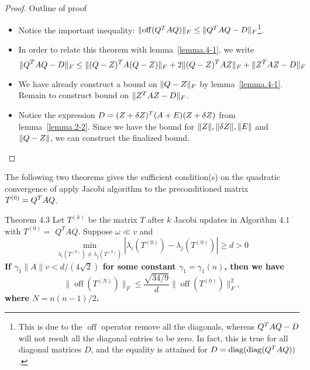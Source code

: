 \documentclass{article}
\DeclareMathOperator{\off}{off}
\begin{document}
\begin{proof}
    {Outline of proof}
    \ 

    \begin{itemize}
        \item Notice the important inequality: $\fnorm{\off(Q\tp AQ)}
        \leq \fnorm{Q\tp A Q - D}$\footnote{This is due to the $\off$
        operator remove all the diagonals, whereas $Q^{T} A Q - D$ will
        not result all the diagonal entries to be zero. In fact, this is
        true for all diagonal matrices $D$, and the equality is attained
        for $D = \operatorname{diag}(\operatorname{diag}(Q^{T} AQ))$.}.
        \item In order to relate this theorem with
        lemma~\ref{lemma.4-1}, we write 
        \begin{equation}\notag
            \|{Q^{T} A Q - D}\|_F \leq \|{(Q-Z)^{T} A (Q-Z)}\|_F 
            + 2\|{(Q-Z)^{T} AZ}\|_F + \|{Z^{T} A Z - D}\|_F
        \end{equation}
        \item We have already construct a bound on $\|{Q-Z}\|_F$ by
        lemma~\ref{lemma.4-1}. Remain to construct bound on $\|{Z^{T}
        A Z - D}\|_F$.
        \item Notice the expression $D=(Z+\delta Z)^{T} (A + E)(Z +
        \delta Z)$ from lemma~\ref{lemma.2-2}. Since we have the bound
        for $\|{Z}\|, \|{\delta Z}\|, \|{E}\|$ and $\|{Q-Z}\|$, we
        can construct the finalized bound.
    \end{itemize}
\end{proof}

The following two theorems gives the sufficient condition(s) on the
quadratic convergence of apply Jacobi algorithm to the preconditioned
matrix $T^{(0)} = Q^{T} A Q$.

\begin{theorem}\label{thm.4-3}
    Theorem 4.3 Let $T^{(k)}$ be the matrix $T$ after $k$ Jacobi updates
    in Algorithm $4.1$ with $T^{(0)}=$ $Q^T A Q$. Suppose $\omega \ll v$
    and 
    $$
        \min_{\lambda_i\left(T^{(0)}\right) 
        \neq \lambda_j\left(T^{(0)}\right)}
        \left|\lambda_i\left(T^{(0)}\right)
        -\lambda_j\left(T^{(0)}\right)\right| \geq d>0 
    $$
    \bf{If $\gamma_1\|A\| v<d /(4 \sqrt{2})$} for some constant
    $\gamma_1=\gamma_1(n)$, then we have 
    $$
        \|\operatorname{off}\left(T^{(N)}\right)
        \|_F \leq \frac{\sqrt{34 / 9}}{d}
        \|\operatorname{off}\left(T^{(0)}\right)\|_F^2,
    $$
    where $N=n(n-1) / 2$.
\end{theorem}
\end{document}
